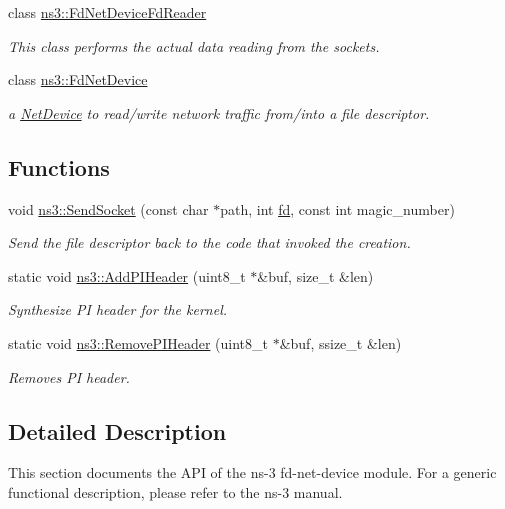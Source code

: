 \begin{DoxyCompactItemize}
class \hyperlink{classns3_1_1FdNetDeviceFdReader}{ns3\+::\+Fd\+Net\+Device\+Fd\+Reader}
\begin{DoxyCompactList}\small\item\em This class performs the actual data reading from the sockets. \end{DoxyCompactList}\item 
class \hyperlink{classns3_1_1FdNetDevice}{ns3\+::\+Fd\+Net\+Device}
\begin{DoxyCompactList}\small\item\em a \hyperlink{classns3_1_1NetDevice}{Net\+Device} to read/write network traffic from/into a file descriptor. \end{DoxyCompactList}\end{DoxyCompactItemize}
\subsection*{Functions}
\begin{DoxyCompactItemize}
\item 
void \hyperlink{group__fd-net-device_gacca4623034d2ebd58b9eebb916545ceb}{ns3\+::\+Send\+Socket} (const char $\ast$path, int \hyperlink{mmwave_2model_2fading-traces_2fading__trace__generator_8m_a44f21d5190b5a6df8089f54799628d7e}{fd}, const int magic\+\_\+number)
\begin{DoxyCompactList}\small\item\em Send the file descriptor back to the code that invoked the creation. \end{DoxyCompactList}\item 
static void \hyperlink{group__fd-net-device_gad3e41a1d562aec7c106c65c5964071b6}{ns3\+::\+Add\+P\+I\+Header} (uint8\+\_\+t $\ast$\&buf, size\+\_\+t \&len)
\begin{DoxyCompactList}\small\item\em Synthesize PI header for the kernel. \end{DoxyCompactList}\item 
static void \hyperlink{group__fd-net-device_ga297e68cd3a421ef11540f26b073ea881}{ns3\+::\+Remove\+P\+I\+Header} (uint8\+\_\+t $\ast$\&buf, ssize\+\_\+t \&len)
\begin{DoxyCompactList}\small\item\em Removes PI header. \end{DoxyCompactList}\end{DoxyCompactItemize}


\subsection{Detailed Description}
This section documents the A\+PI of the ns-\/3 fd-\/net-\/device module. For a generic functional description, please refer to the ns-\/3 manual. 


